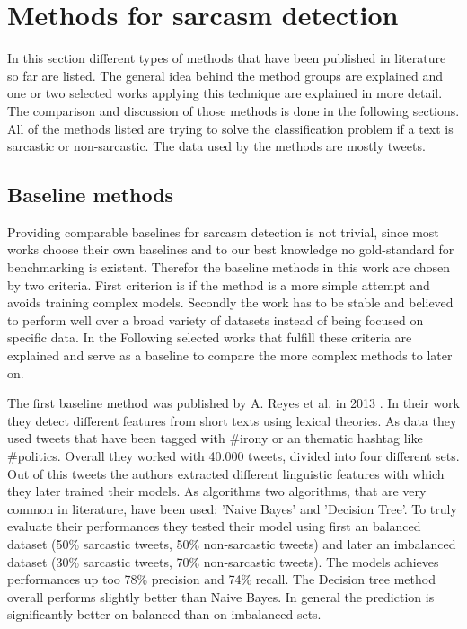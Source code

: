\documentclass[sigconf,  review=false, nonacm=true]{acmart}
\begin{document}
\section{Methods for sarcasm detection}

In this section different types of methods that have been published in literature so far are listed. The general idea behind the method groups are explained and one or two selected works applying this technique are explained in more detail. The comparison and discussion of those methods is done in the following sections.
All of the methods listed are trying to solve the classification problem if a text is sarcastic or non-sarcastic. The data used by the methods are mostly tweets.

\subsection{Baseline methods}

Providing comparable baselines for sarcasm detection is not trivial, since most works choose their own baselines and to our best knowledge no gold-standard for benchmarking is existent. Therefor the baseline methods in this work are chosen by two criteria. First criterion is if the method is a more simple attempt and avoids training complex models. Secondly the work has to be stable and believed to perform well over a broad variety of datasets instead of being focused on specific data. 
In the Following selected works that fulfill these criteria are explained and serve as a baseline to compare the more complex methods to later on.

The first baseline method was published by A. Reyes et al. in 2013 \cite{A-multidimensional-approach-for-detecting-irony-in-Twitter}. In their work they detect different features from short texts using lexical theories. As data they used tweets that have been tagged with \#irony or an thematic hashtag like \#politics. Overall they worked with 40.000 tweets, divided into four different sets. Out of this tweets the authors extracted different linguistic features with which they later trained their models.
As algorithms two algorithms, that are very common in literature, have been used: 'Naive Bayes' and 'Decision Tree'. To truly evaluate their performances they tested their model using first an balanced dataset (50\% sarcastic tweets, 50\% non-sarcastic tweets) and later an imbalanced dataset (30\% sarcastic tweets, 70\% non-sarcastic tweets). The models achieves performances up too 78\% precision and 74\% recall. The Decision tree method overall performs slightly better than Naive Bayes. In general the prediction is significantly better on balanced than on imbalanced sets.
\end{document}
